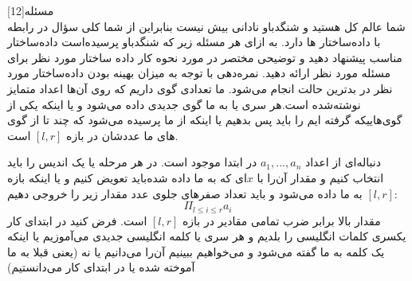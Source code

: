 ‌مسئله[12]  
\\
شما عالم کل هستید و شنگدباو نادانی بیش نیست بنابراین از شما کلی سؤال در رابطه با داده‌ساختار ها دارد. به ازای هر مسئله زیر که شنگدباو پرسیده‌است داده‌ساختار مناسب پیشنهاد دهید و توضیحی مختصر در مورد نحوه کار داده ساختار مورد نظر برای مسئله مورد نظر ارائه دهید. نمره‌دهی با توجه به میزان بهینه بودن داده‌ساختار مورد نظر در بدترین حالت انجام می‌شود.
ما تعدادی گوی داریم که روی آن‌ها اعداد متمایز نوشته‌شده است.هر سری یا به ما گوی جدیدی داده می‌شود و یا اینکه یکی از گوی‌هاییکه گرفته ایم را باید پس بدهیم یا اینکه از ما پرسیده می‌شود که چند تا از گوی های ما عددشان در بازه 
$[l, r]$
است.

دنباله‌ای از اعداد 
$a_1, ..., a_n$
در ابتدا موجود است. در هر مرحله یا یک اندیس‌ را باید انتخاب کنیم و مقدار آن‌را با $x$‌ای که به ما داده شده‌باید تعویض کنیم و یا اینکه بازه 
$[l, r]$
به ما داده می‌شود و باید تعداد صفر‌های جلوی عدد مقدار زیر را خروجی دهیم:
$$\Pi_{l \le i \le r} a_i$$
مقدار بالا برابر ضرب تمامی مقادیر در بازه 
$[l,r]$
است.
فرض کنید در ابتدای کار یکسری کلمات انگلیسی را بلدیم و هر سری یا کلمه انگلیسی جدیدی می‌آموزیم یا اینکه یک کلمه به ما گفته می‌شود و می‌خواهیم ببینیم آن‌را می‌دانیم یا نه (یعنی قبلا به ما آموخته شده یا در ابتدای کار می‌دانستیم)



